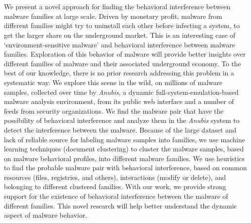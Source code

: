 \chapter{\abstractname}
We present a novel approach for finding the behavioral interference between malware families at large scale.
Driven by monetary profit, malware from different families might try to uninstall each other before infecting a system, to get the larger share on the underground market.
This is an interesting case of `environment-sensitive malware' and behavioral interference between malware families.
Exploration of this behavior of malware will provide better insights over different families of malware and their associated underground economy.
To the best of our knowledge, there is no prior research addressing this problem in a systematic way.
We explore this scene in the wild, on millions of malware samples, collected over time by \emph{Anubis}, a dynamic full-system-emulation-based malware analysis environment, from its public web interface and a number of feeds from security organizations.
We find the malware pair that have the possibility of behavioral interference and analyze them in the \emph{Anubis} system to detect the interference between the malware.
Because of the large dataset and lack of reliable source for labeling malware samples into families, we use machine learning techniques (document clustering) to cluster the malware samples, based on malware behavioral profiles, into different malware families.
We use heuristics to find the probable malware pair with behavioral interference, based on common resources (files, registries, and others), interactions (modify or delete), and belonging to different clustered families.
With our work, we provide strong support for the existence of behavioral interference between the malware of different families.
This novel research will help better understand the dynamic aspect of malware behavior.
